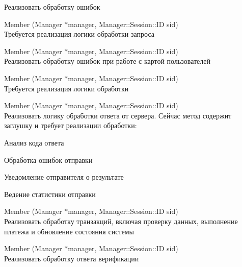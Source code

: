 \begin{DoxyRefList}
Реализовать обработку ошибок  
\item[Member \doxylink{class_g_n_e_t_1_1_s_s_o_get_ticket_req_a7d2f631129750466c71a3c53910adad9}{GNET\+::SSOGet\+Ticket\+Req\+::Process} (Manager \texorpdfstring{$\ast$}{*}manager, Manager\+::\+Session\+::\+ID sid)]\hfill \\
\label{todo__todo000023}%
%
Требуется реализация логики обработки запроса 
\item[Member \doxylink{class_g_n_e_t_1_1_status_announce_ae5a6d07d7f9047b0d0a53cce09ed94b9}{GNET\+::Status\+Announce\+::Process} (Manager \texorpdfstring{$\ast$}{*}manager, Manager\+::\+Session\+::\+ID sid)]\hfill \\
\label{todo__todo000024}%
%
Реализовать обработку ошибок при работе с картой пользователей  
\item[Member \doxylink{class_g_n_e_t_1_1_sys_send_mail3___re_ac8efa0a3f269852ac072bef063dbfc81}{GNET\+::Sys\+Send\+Mail3\+\_\+\+Re\+::Process} (Manager \texorpdfstring{$\ast$}{*}manager, Manager\+::\+Session\+::\+ID sid)]\hfill \\
\label{todo__todo000025}%
%
Требуется реализация логики обработки  
\item[Member \doxylink{class_g_n_e_t_1_1_sys_send_mail___re_aee9b57bf0d0707a080303a041e0dab0d}{GNET\+::Sys\+Send\+Mail\+\_\+\+Re\+::Process} (Manager \texorpdfstring{$\ast$}{*}manager, Manager\+::\+Session\+::\+ID sid)]\hfill \\
\label{todo__todo000026}%
%
Реализовать логику обработки ответа от сервера. Сейчас метод содержит заглушку и требует реализации обработки\+:
\begin{DoxyItemize}
\item Анализ кода ответа
\item Обработка ошибок отправки
\item Уведомление отправителя о результате
\item Ведение статистики отправки 
\end{DoxyItemize}
\item[Member \doxylink{class_g_n_e_t_1_1_trans_buy_point_aad328b963d528b2d8a695e3793c73529}{GNET\+::Trans\+Buy\+Point\+::Process} (Manager \texorpdfstring{$\ast$}{*}manager, Manager\+::\+Session\+::\+ID sid)]\hfill \\
\label{todo__todo000027}%
%
Реализовать обработку транзакций, включая проверку данных, выполнение платежа и обновление состояния системы  
\item[Member \doxylink{class_g_n_e_t_1_1_verify_master___re_a549010699fc4534896e58ff3aef11b9d}{GNET\+::Verify\+Master\+\_\+\+Re\+::Process} (Manager \texorpdfstring{$\ast$}{*}manager, Manager\+::\+Session\+::\+ID sid)]\hfill \\
\label{todo__todo000028}%
%
Реализовать обработку ответа верификации 
\end{DoxyRefList}